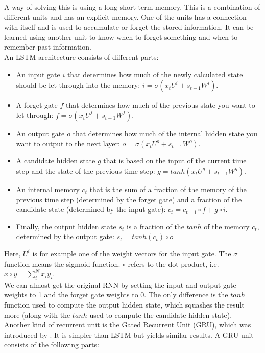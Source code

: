 \documentclass[a4paper]{article}
\begin{document}
A way of solving this is using a long short-term memory. This is a combination of different units and has an explicit memory. One of the units has a connection with itself and is used to accumulate or forget the stored information. It can be learned using another unit to know when to forget something and when to remember past information.\\
An LSTM architecture consists of different parts:
\begin{itemize}
\item An input gate $i$ that determines how much of the newly calculated state should be let through into the memory: $i = \sigma (x_tU^i + s_{t-1}W^i)$.
\item A forget gate $f$ that determines how much of the previous state you want to let through: $f = \sigma (x_tU^f + s_{t-1}W^f)$.
\item An output gate $o$ that determines how much of the internal hidden state you want to output to the next layer: $o = \sigma (x_tU^o + s_{t-1}W^o)$.
\item A candidate hidden state $g$ that is based on the input of the current time step and the state of the previous time step: $g = tanh(x_tU^g + s_{t-1}W^g)$.
\item An internal memory $c_t$ that is the sum of a fraction of the memory of the previous time step (determined by the forget gate) and a fraction of the candidate state (determined by the input gate): $c_t = c_{t-1} \circ f + g \circ i$.
\item Finally, the output hidden state $s_t$ is a fraction of the $tanh$ of the memory $c_t$, determined by the output gate: $s_t = tanh(c_t) \circ o$
\end{itemize}
Here, $U^i$ is for example one of the weight vectors for the input gate. The $\sigma$ function means the sigmoid function. $\circ$ refers to the dot product, i.e. $x \circ y = \sum_i^N x_i y_i$.\\
We can almost get the original RNN by setting the input and output gate weights to 1 and the forget gate weights to 0. The only difference is the $tanh$ function used to compute the output hidden state, which squashes the result more (along with the $tanh$ used to compute the candidate hidden state).\\
Another kind of recurrent unit is the Gated Recurrent Unit (GRU), which was introduced by \cite{Cho2014LearningTranslation}. It is simpler than LSTM but yields similar results. A GRU unit consists of the following parts:
\end{document}
